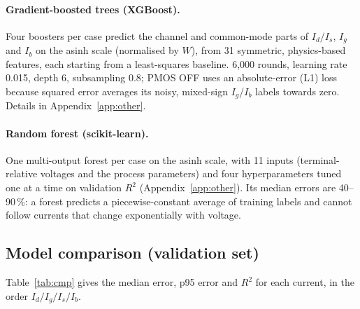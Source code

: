 \documentclass[11pt,a4paper]{article}
\begin{document}
\paragraph{Gradient-boosted trees (XGBoost).} Four boosters per case predict the channel and
common-mode parts of $I_d/I_s$, $I_g$ and $I_b$ on the asinh scale (normalised by $W$), from 31
symmetric, physics-based features, each starting from a least-squares baseline. 6{,}000 rounds,
learning rate 0.015, depth 6, subsampling 0.8; PMOS OFF uses an absolute-error (L1) loss because
squared error averages its noisy, mixed-sign $I_g$/$I_b$ labels towards zero. Details in
Appendix~\ref{app:other}.

\paragraph{Random forest (scikit-learn).} One multi-output forest per case on the asinh scale, with
11 inputs (terminal-relative voltages and the process parameters) and four hyperparameters tuned one at
a time on validation $R^2$ (Appendix~\ref{app:other}). Its median errors are 40--90\,\%: a forest
predicts a piecewise-constant average of training labels and cannot follow currents that change
exponentially with voltage.

\subsection{Model comparison (validation set)}
Table~\ref{tab:cmp} gives the median error, p95 error and $R^2$ for each current, in the order
$I_d / I_g / I_s / I_b$.
\end{document}
